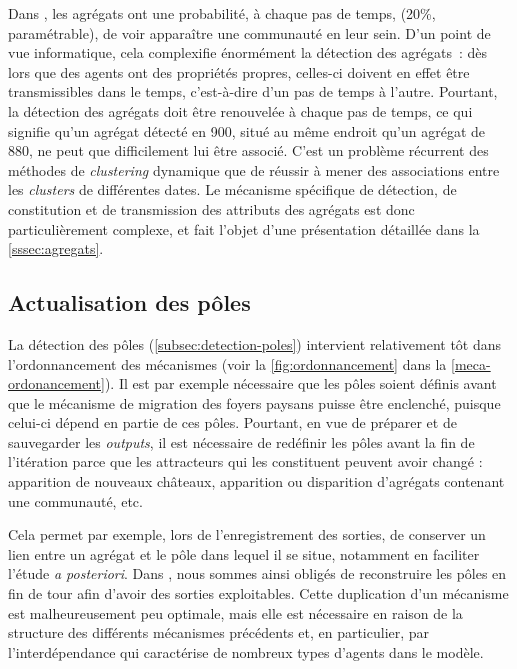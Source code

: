 \begin{tcolorbox}[breakable,left=0pt,right=0pt,top=0pt,bottom=0pt,
	colback=gray!15,colframe=gray!15,width=\dimexpr\textwidth\relax, 
	enlarge left by=0mm, boxsep=5pt,arc=0pt,outer arc=0pt]
	
Dans \simfeodal{}, les agrégats ont une probabilité, à chaque pas de temps, (20\%, paramétrable), de voir apparaître une communauté en leur sein.
D'un point de vue informatique, cela complexifie énormément la détection des agrégats :
	dès lors que des agents ont des propriétés propres, celles-ci doivent en effet être transmissibles dans le temps, c'est-à-dire d'un pas de temps à l'autre.
Pourtant, la détection des agrégats doit être renouvelée à chaque pas de temps, ce qui signifie qu'un agrégat détecté en 900, situé au même endroit qu'un agrégat de 880, ne peut que difficilement lui être associé.
C'est un problème récurrent des méthodes de \textit{clustering} dynamique que de réussir à mener des associations entre les \textit{clusters} de différentes dates.
Le mécanisme spécifique de détection, de constitution et de transmission des attributs des agrégats est donc particulièrement complexe, et fait l'objet d'une présentation détaillée dans la \cref{sssec:agregats}.
\end{tcolorbox}

\subsection{Actualisation des pôles}

\begin{tcolorbox}[breakable,left=0pt,right=0pt,top=0pt,bottom=0pt,
	colback=gray!15,colframe=gray!15,width=\dimexpr\textwidth\relax, 
	enlarge left by=0mm, boxsep=5pt,arc=0pt,outer arc=0pt]

La détection des pôles (\cref{subsec:detection-poles}) intervient relativement tôt dans l'ordonnancement des mécanismes (voir la \cref{fig:ordonnancement} dans la \cref{meca-ordonancement}).
Il est par exemple nécessaire que les pôles soient définis avant que le mécanisme de migration des foyers paysans puisse être enclenché, puisque celui-ci dépend en partie de ces pôles.
Pourtant, en vue de préparer et de sauvegarder les \textit{outputs}, il est nécessaire de redéfinir les pôles avant la fin de l'itération parce que les attracteurs qui les constituent peuvent avoir changé :
	apparition de nouveaux châteaux, apparition ou disparition d'agrégats contenant une communauté, etc.

\medskip
Cela permet par exemple, lors de l'enregistrement des sorties, de conserver un lien entre un agrégat et le pôle dans lequel il se situe, notamment en faciliter l'étude \textit{a posteriori}.
Dans \simfeodal{}, nous sommes ainsi obligés de reconstruire les pôles en fin de tour afin d'avoir des sorties exploitables.
Cette duplication d'un mécanisme est malheureusement peu optimale, mais elle est nécessaire en raison de la structure des différents mécanismes précédents et, en particulier, par l'interdépendance qui caractérise de nombreux types d'agents dans le modèle.
\end{tcolorbox}


